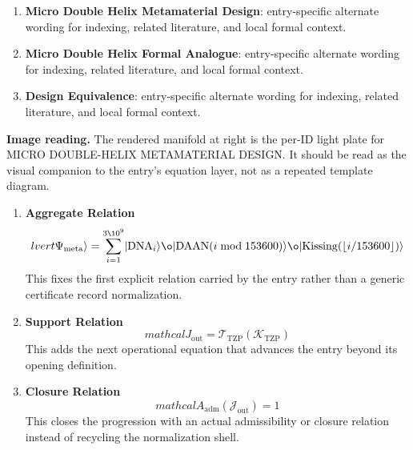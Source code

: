 \begin{enumerate}[leftmargin=1.6em,itemsep=6pt,topsep=4pt]
\item \textbf{Micro Double Helix Metamaterial Design}: entry-specific alternate wording for indexing, related literature, and local formal context.
\item \textbf{Micro Double Helix Formal Analogue}: entry-specific alternate wording for indexing, related literature, and local formal context.
\item \textbf{Design Equivalence}: entry-specific alternate wording for indexing, related literature, and local formal context.
\end{enumerate}

\begin{samepage}
\noindent\begin{minipage}[t]{0.45\linewidth}
\vspace{0pt}
\raggedright
\scriptsize\textbf{Image reading.} The rendered manifold at right is the per-ID light plate for MICRO DOUBLE-HELIX METAMATERIAL DESIGN. It should be read as the visual companion to the entry's equation layer, not as a repeated template diagram.\par
\end{minipage}\hfill
\begin{minipage}[t]{0.53\linewidth}
\vspace*{-0.10in}
\raggedright
{}
\end{minipage}
\end{samepage}

\clearpage


\begin{enumerate}[leftmargin=1.6em,itemsep=9pt,topsep=6pt]
\item \textbf{Aggregate Relation}
\[
lvert \Psi_{\mathrm{meta}} \rangle = \sum_{i=1}^{3\10^{9}} \lvert \mathrm{DNA}_{i} \rangle \o\lvert \mathrm{DAAN}(i \bmod 153600) \rangle \o\lvert \mathrm{Kissing}(\lfloor i/153600 \rfloor) \rangle
\]
This fixes the first explicit relation carried by the entry rather than a generic certificate record normalization.

\item \textbf{Support Relation}
\[
mathcal{J}_{\mathrm{out}} = \mathcal{T}_{\mathrm{TZP}}\!\left(\mathcal{K}_{\mathrm{TZP}}\right)
\]
This adds the next operational equation that advances the entry beyond its opening definition.

\item \textbf{Closure Relation}
\[
mathcal{A}_{\mathrm{adm}}\!\left(\mathcal{J}_{\mathrm{out}}\right)=1
\]
This closes the progression with an actual admissibility or closure relation instead of recycling the normalization shell.
\end{enumerate}


